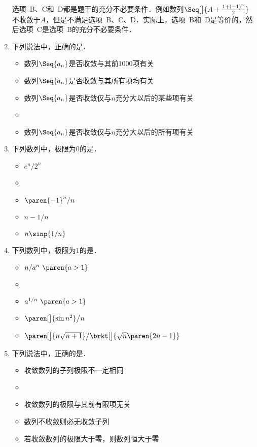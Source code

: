 \begin{enumerate}
  \ifshowsol
  选项~B、C和~D都是题干的充分不必要条件．例如数列\(\Seq[\big]{A + \frac{1+(-1)^n}{2}}\)不收敛于\(A\)，但是不满足选项~B、C、D．实际上，选项~B和~D是等价的，然后选项~C是选项~B的充分不必要条件．
  \fi

\item 下列说法中，正确的是\uline{\makebox[10em]{}}．
  \begin{itemize}
    \renewcommand{\labelitemi}{\faCircleThin}
  \item 数列\(\Seq{a_n}\)是否收敛与其前\(1000\)项有关
  \item 数列\(\Seq{a_n}\)是否收敛与其所有项均有关
  \item 数列\(\Seq{a_n}\)是否收敛仅与\(n\)充分大以后的某些项有关
    \ifshowsol
  \item[\faCircle]
    \else
  \item
    \fi
    数列\(\Seq{a_n}\)是否收敛仅与\(n\)充分大以后的所有项有关
  \end{itemize}

\item 下列数列中，极限为\(0\)的是\uline{\makebox[6em]{}}．
  \begin{itemize}
    \renewcommand{\labelitemi}{\faCircleThin}
  \item \(e^n/2^n\)
    \ifshowsol
  \item[\faCircle]
    \else
  \item
    \fi
    \(\paren{-1}^n/n\)
  \item \(n - 1/n\)
  \item \(n \sinp{1/n}\)
  \end{itemize}

\item 下列数列中，极限为\(1\)的是\uline{\makebox[6em]{}}．
  \begin{itemize}
    \renewcommand{\labelitemi}{\faCircleThin}
  \item \(n/a^n\ \paren{a > 1}\)
    \ifshowsol
  \item[\faCircle]
    \else
  \item
    \fi
    \(a^{1/n}\ \paren{a > 1}\)
  \item \(\paren[\big]{\sin n^2}\big/{n}\)
  \item \(\paren[\big]{n \sqrt{n+1}}\big/\brkt[\big]{\sqrt n \paren{2n-1}}\)
  \end{itemize}

\item 下列说法中，正确的是\uline{\makebox[10em]{}}．
  \begin{itemize}
    \renewcommand{\labelitemi}{\faCircleThin}
  \item 收敛数列的子列极限不一定相同
    \ifshowsol
  \item[\faCircle]
    \else
  \item
    \fi
    收敛数列的极限与其前有限项无关
  \item 数列不收敛则必无收敛子列
  \item 若收敛数列的极限大于零，则数列恒大于零
  \end{itemize}


\end{enumerate}

